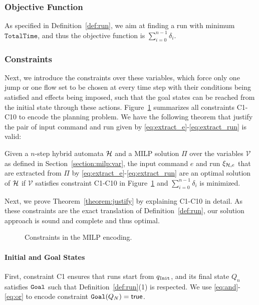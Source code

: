 \documentclass[sigconf]{acmart}
\newcommand{\true}{\mathsf{true}}
\begin{document}


\subsubsection{Objective Function}

As specified in Definition~\ref{def:run}, we aim at finding a run with minimum $\texttt{TotalTime}$, and thus the objective function is $\sum_{i=0}^{n-1} \delta_i$.

\subsubsection{Constraints}
Next, we introduce the constraints over these variables, which force only one jump or one flow set to be chosen at every time step with their conditions being satisfied and effects being imposed, such that the goal states can be reached from the initial state through these actions. Figure~\ref{fig:conditions} summarizes all constraints C1-C10 to encode the planning problem. We have the following theorem that justify the pair of input command and run given by \eqref{eq:extract_e}-\eqref{eq:extract_run} is valid:

\begin{theorem} \label{theorem:justify}
Given a $n$-step hybrid automata $\mathcal{H}$ and a MILP solution $\Pi$ over the variables $\mathcal{V}$ as defined in Section~\ref{section:milp:var}, the input command $e$ and run $\xi_{\mathcal{H},e}$ that are extracted from $\Pi$ by  \eqref{eq:extract_e}-\eqref{eq:extract_run} are an optimal solution of $\mathcal{H}$ if $\mathcal{V}$ satisfies constraint C1-C10 in Figure~\ref{fig:conditions} and $\sum_{i=0}^{n-1} \delta_i$ is minimized.
\end{theorem}

Next, we prove Theorem~\ref{theorem:justify} by explaining C1-C10 in detail. As these constraints are the exact translation of Definition~\ref{def:run}, our solution approach is sound and complete and thus optimal.

\begin{figure}[t]
\centering
  
  \caption{\small Constraints in the MILP encoding.}
  \label{fig:conditions}
\end{figure}

\paragraph{Initial and Goal States}
First, constraint C1 ensures that runs start from $q_\mathtt{Init}$, and its final state $Q_n$ satisfies $\mathtt{Goal}$ such that Definition~\ref{def:run}(1) is respected. We use \eqref{eq:and}-\eqref{eq:or} to encode constraint $\goal(Q_N) = \true$.
\end{document}

